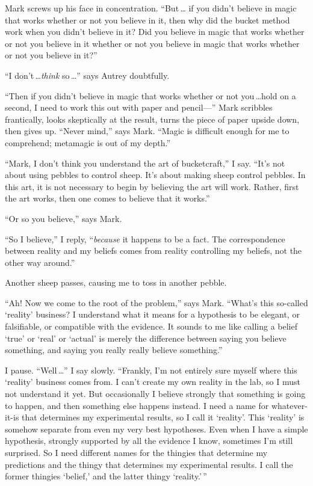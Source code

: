{
  Mark screws up his face in concentration. ``But\,\ldots
  if you didn't believe in magic that works whether
or not you believe in it, then why did the bucket method work when you
didn't believe in it? Did you believe in magic that
works whether or not you believe in it whether or not you believe in
magic that works whether or not you believe in it?''}

{
  ``I don't\,\ldots \textit{think} so\,\ldots''
  says Autrey doubtfully.}

{
 ``Then if you didn't believe in
magic that works whether or not you\,\ldots hold on a second, I need to
work this out with paper and pencil---'' Mark
scribbles frantically, looks skeptically at the result, turns the piece
of paper upside down, then gives up. ``Never
mind,'' says Mark. ``Magic is
difficult enough for me to comprehend; metamagic is out of my
depth.''}

{
 ``Mark, I don't think you
understand the art of bucketcraft,'' I say.
``It's not about using pebbles to
control sheep. It's about making sheep control pebbles.
In this art, it is not necessary to begin by believing the art will
work. Rather, first the art works, then one comes to believe that it
works.''}

{
 ``Or so you believe,'' says
Mark.}

{
 ``So I believe,'' I reply,
``\textit{because} it happens to be a fact. The
correspondence between reality and my beliefs comes from reality
controlling my beliefs, not the other way around.''}

{
 Another sheep passes, causing me to toss in another pebble.}

{
 ``Ah! Now we come to the root of the
problem,'' says Mark.
``What's this so-called
`reality' business? I understand what it
means for a hypothesis to be elegant, or falsifiable, or compatible
with the evidence. It sounds to me like calling a belief
`true' or
`real' or
`actual' is merely the difference
between saying you believe something, and saying you really really
believe something.''}

{
 I pause. ``Well\,\ldots'' I say
slowly. ``Frankly, I'm not entirely
sure myself where this `reality'
business comes from. I can't create my own reality in
the lab, so I must not understand it yet. But occasionally I believe
strongly that something is going to happen, and then something else
happens instead. I need a name for whatever-it-is that determines my
experimental results, so I call it
`reality'. This
`reality' is somehow separate from even
my very best hypotheses. Even when I have a simple hypothesis, strongly
supported by all the evidence I know, sometimes I'm
still surprised. So I need different names for the thingies that
determine my predictions and the thingy that determines my experimental
results. I call the former thingies
`belief,' and the latter thingy
`reality.'\,''}


